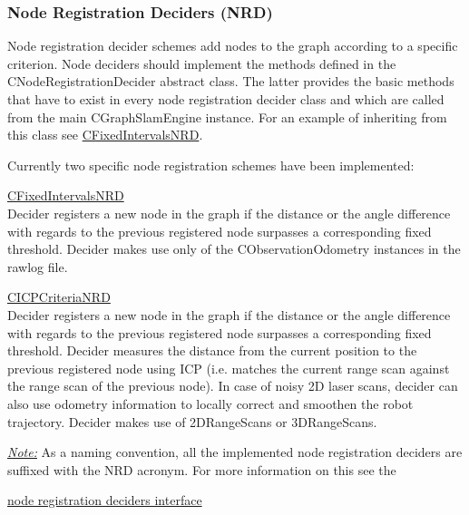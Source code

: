 \subsubsection{Node Registration Deciders (NRD)}
Node registration decider schemes add nodes to the graph according to a
specific criterion. Node deciders should implement the methods defined in the
CNodeRegistrationDecider abstract class. The latter provides the basic methods
that have to exist in every node registration decider class and which are
called from the main CGraphSlamEngine instance.  For an example of inheriting
from this class see
\href{http://reference.mrpt.org/devel/classmrpt_1_1graphslam_1_1deciders_1_1_c_fixed_intervals_n_r_d.html}{CFixedIntervalsNRD}.


Currently two specific node registration schemes have been implemented:
\begin{itemize*}
    \item \href{http://reference.mrpt.org/devel/classmrpt_1_1graphslam_1_1deciders_1_1_c_fixed_intervals_n_r_d.html}{CFixedIntervalsNRD} \hfill\\
    Decider registers a new node in the graph if the distance or the angle
    difference with regards to the previous registered node surpasses a
    corresponding fixed threshold. Decider makes use only of the
    CObservationOdometry instances in the rawlog file.
    \item \href{http://reference.mrpt.org/devel/structmrpt_1_1graphslam_1_1deciders_1_1_c_i_c_p_criteria_n_r_d_1_1_t_params.html}{CICPCriteriaNRD} \hfill\\
    Decider registers a new node in the graph if the distance or the angle
    difference with regards to the previous registered node surpasses a
    corresponding fixed threshold. Decider measures the distance from the
    current position to the previous registered node using ICP (i.e. matches
    the current range scan against the range scan of the previous node). In
    case of noisy 2D laser scans, decider can also use odometry information to
    locally correct and smoothen the robot trajectory. Decider makes use of
    2DRangeScans or 3DRangeScans.
\end{itemize*}


\ul{\textit{Note:}} As a naming convention, all the implemented node registration deciders are
suffixed with the NRD acronym.
For more information on this see the

\href{http://reference.mrpt.org/devel/classmrpt_1_1graphslam_1_1deciders_1_1_c_node_registration_decider.html}{node
registration deciders interface}

